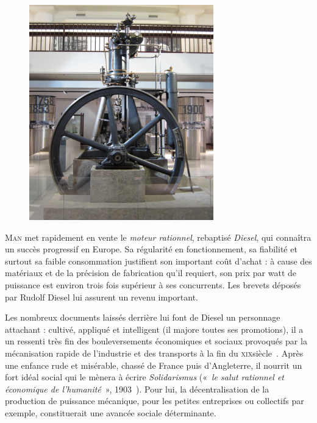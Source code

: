 	\begin{figure}
		\begin{center}
			\includegraphics[width=8cm]{images/diesel_third_prototype.jpg}
		\end{center}
		{ \ccbysa \olivier}
		\label{fig_diesel_third_prototype}
	\end{figure}
	
	\textsc{Man} met rapidement en vente le \textit{moteur rationnel}, rebaptisé \textit{Diesel}, qui connaîtra un succès progressif en Europe. Sa régularité en fonctionnement, sa fiabilité et surtout sa faible consommation justifient son important coût d’achat : à cause des matériaux et de la précision de fabrication qu’il requiert, son prix par \si{watt} de puissance est environ trois fois supérieur à ses concurrents. Les brevets déposés par Rudolf Diesel lui assurent un revenu important.
	
	Les nombreux documents laissés derrière lui font de Diesel un personnage attachant : cultivé, appliqué et intelligent (il majore toutes ses promotions), il a un ressenti très fin des bouleversements économiques et sociaux provoqués par la mécanisation rapide de l’industrie et des transports à la fin du \textsc{xix}\ieme siècle~\cite{grosser1978,thomas1978,coltrane1997}. Après une enfance rude et misérable, chassé de France puis d’Angleterre, il nourrit un fort idéal social qui le mènera à écrire \textit{Solidarismus} («~\textit{le salut rationnel et économique de l’humanité}~», 1903~\cite{diesel1903}). Pour lui, la décentralisation de la production de puissance mécanique, pour les petites entreprises ou collectifs par exemple, constituerait une avancée sociale déterminante.
	
